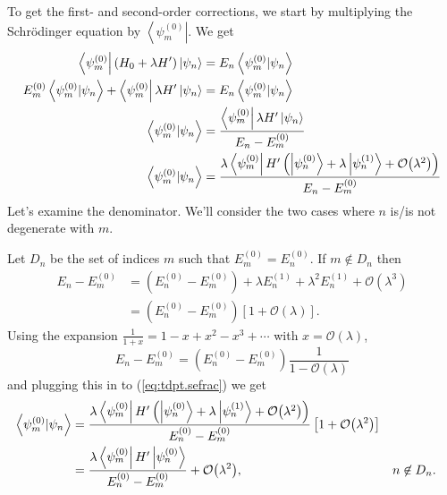 \documentclass[11pt]{article}
\newcommand{\Od}[1]{\mathcal{O}{\left(#1\right)}}
\newcommand{\bra}[1]{\left\langle#1\right|}
\newcommand{\ket}[1]{\left|#1\right\rangle}
\newcommand{\braket}[2]{\left\langle#1|#2\right\rangle}
\theoremstyle{theorem}
\theoremstyle{remark}
\theoremstyle{step}
\theoremstyle{gap}
\begin{document}
To get the first- and second-order corrections, we start by multiplying the Schr\"odinger equation by \(\bra{\psi_m^{(0)}}\). We get
\begin{align}
\bra{\psi_m^{(0)}} (H_0 + \lambda H^\prime) \ksn{n} &= E_n \braket{\psi_m^{(0)}}{\psi_n} \nonumber\\
E_m^{(0)} \braket{\psi_m^{(0)}}{\psi_n} + \bra{\psi_m^{(0)}} \lambda H^\prime \ksn{n} &= E_n \braket{\psi_m^{(0)}}{\psi_{n}} \nonumber\\
\braket{\psi_m^{(0)}}{\psi_n} &= \frac{\bra{\psi_m^{(0)}}\lambda H^\prime \ket{\psi_n}}{E_n - E_m^{(0)}} \nonumber\\
\braket{\psi_m^{(0)}}{\psi_n} &= \frac{\lambda\bra{\psi_m^{(0)}} H^\prime \left(\ksnp{n}{0} + \lambda \ksnp{n}{1} + \Od{\lambda^2}\right)}{E_n - E_m^{(0)}} \label{eq:tdpt.sefrac}
\end{align}
Let's examine the denominator. We'll consider the two cases where \(n\) is/is not degenerate with \(m\).

Let \(D_n\) be the set of indices \(m\) such that \(E_m^{(0)} = E_n^{(0)}\). If \(m \not\in D_n\) then
\begin{align*}
E_n - E_m^{(0)} &= {\left(E_n^{(0)} - E_m^{(0)}\right)} + \lambda E_n^{(1)} + \lambda^2 E_n^{(1)} + \Od{\lambda^3}\\
&= {\left(E_n^{(0)} - E_m^{(0)}\right)}\left[1 + \Od{\lambda}\right].
\end{align*}
Using the expansion \(\frac{1}{1+x} = 1 - x + x^2 - x^3 + \cdots\) with \(x = \Od{\lambda}\),
\[E_n - E_m^{(0)} = \left(E_n^{(0)} - E_m^{(0)}\right) \frac{1}{1 - \Od{\lambda}}\]
and plugging this in to (\ref{eq:tdpt.sefrac}) we get
\begin{align}
\braket{\psi_m^{(0)}}{\psi_n} &= \frac{\lambda \bra{\psi_m^{(0)}} H^\prime \left(\ksnp{n}{0} + \lambda \ksnp{n}{1} + \Od{\lambda^2}\right)}{E_n^{(0)} - E_m^{(0)}}\left[1+\Od{\lambda^2}\right] \nonumber\\
&= \frac{\lambda \bra{\psi_m^{(0)}} H^\prime \ksnp{n}{0}}{E_n^{(0)} - E_m^{(0)}}+ \Od{\lambda^2},
&& n \not\in D_n. \label{eq:tdpt.nDn}
\end{align}
\end{document}
